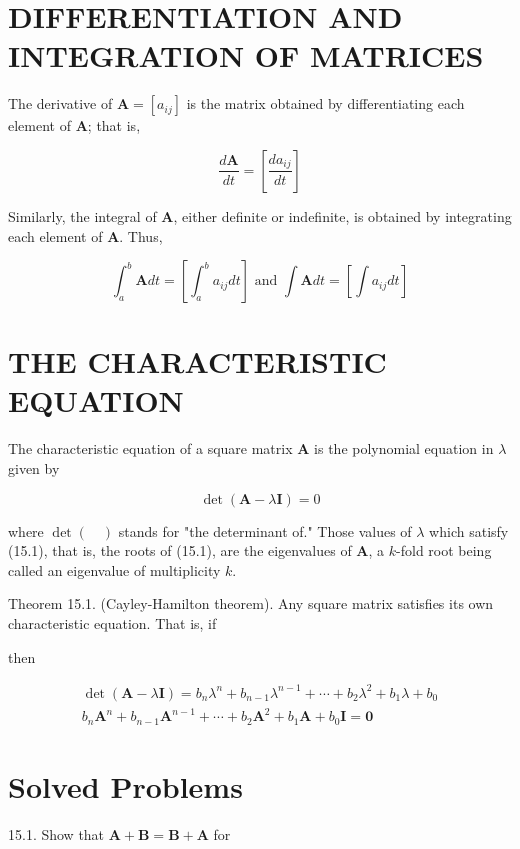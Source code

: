 \documentclass[10pt]{article}
\begin{document}
\section*{DIFFERENTIATION AND INTEGRATION OF MATRICES}
The derivative of $\mathbf{A}=\left[a_{i j}\right]$ is the matrix obtained by differentiating each element of $\mathbf{A}$; that is,

$$
\frac{d \mathbf{A}}{d t}=\left[\frac{d a_{i j}}{d t}\right]
$$

Similarly, the integral of $\mathbf{A}$, either definite or indefinite, is obtained by integrating each element of $\mathbf{A}$. Thus,

$$
\int_{a}^{b} \mathbf{A} d t=\left[\int_{a}^{b} a_{i j} d t\right] \text { and } \int \mathbf{A} d t=\left[\int a_{i j} d t\right]
$$

\section*{THE CHARACTERISTIC EQUATION}
The characteristic equation of a square matrix $\mathbf{A}$ is the polynomial equation in $\lambda$ given by


\begin{equation*}
\operatorname{det}(\mathbf{A}-\lambda \mathbf{I})=0 \tag{15.1}
\end{equation*}


where $\operatorname{det}(\quad)$ stands for "the determinant of." Those values of $\lambda$ which satisfy (15.1), that is, the roots of (15.1), are the eigenvalues of $\mathbf{A}$, a $k$-fold root being called an eigenvalue of multiplicity $k$.

Theorem 15.1. (Cayley-Hamilton theorem). Any square matrix satisfies its own characteristic equation. That is, if

then

$$
\begin{gathered}
\operatorname{det}(\mathbf{A}-\lambda \mathbf{I})=b_{n} \lambda^{n}+b_{n-1} \lambda^{n-1}+\cdots+b_{2} \lambda^{2}+b_{1} \lambda+b_{0} \\
b_{n} \mathbf{A}^{n}+b_{n-1} \mathbf{A}^{n-1}+\cdots+b_{2} \mathbf{A}^{2}+b_{1} \mathbf{A}+b_{0} \mathbf{I}=\mathbf{0}
\end{gathered}
$$

\section*{Solved Problems}
15.1. Show that $\mathbf{A}+\mathbf{B}=\mathbf{B}+\mathbf{A}$ for
\end{document}
